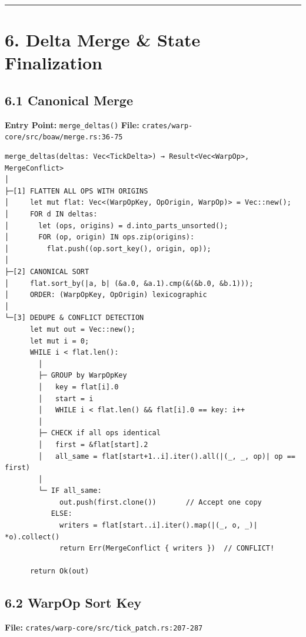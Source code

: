\documentclass[
]{book}
\begin{document}
\begin{center}\rule{0.5\linewidth}{0.5pt}\end{center}

\section{6. Delta Merge \& State
Finalization}\label{delta-merge-state-finalization}

\subsection{6.1 Canonical Merge}\label{canonical-merge}

\textbf{Entry Point:} \texttt{merge\_deltas()} \textbf{File:}
\texttt{crates/warp-core/src/boaw/merge.rs:36-75}

\begin{verbatim}
merge_deltas(deltas: Vec<TickDelta>) → Result<Vec<WarpOp>, MergeConflict>
│
├─[1] FLATTEN ALL OPS WITH ORIGINS
│     let mut flat: Vec<(WarpOpKey, OpOrigin, WarpOp)> = Vec::new();
│     FOR d IN deltas:
│       let (ops, origins) = d.into_parts_unsorted();
│       FOR (op, origin) IN ops.zip(origins):
│         flat.push((op.sort_key(), origin, op));
│
├─[2] CANONICAL SORT
│     flat.sort_by(|a, b| (&a.0, &a.1).cmp(&(&b.0, &b.1)));
│     ORDER: (WarpOpKey, OpOrigin) lexicographic
│
└─[3] DEDUPE & CONFLICT DETECTION
      let mut out = Vec::new();
      let mut i = 0;
      WHILE i < flat.len():
        │
        ├─ GROUP by WarpOpKey
        │   key = flat[i].0
        │   start = i
        │   WHILE i < flat.len() && flat[i].0 == key: i++
        │
        ├─ CHECK if all ops identical
        │   first = &flat[start].2
        │   all_same = flat[start+1..i].iter().all(|(_, _, op)| op == first)
        │
        └─ IF all_same:
             out.push(first.clone())       // Accept one copy
           ELSE:
             writers = flat[start..i].iter().map(|(_, o, _)| *o).collect()
             return Err(MergeConflict { writers })  // CONFLICT!

      return Ok(out)
\end{verbatim}

\subsection{6.2 WarpOp Sort Key}\label{warpop-sort-key}

\textbf{File:} \texttt{crates/warp-core/src/tick\_patch.rs:207-287}
\end{document}

